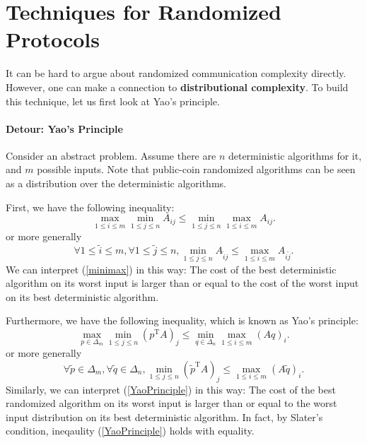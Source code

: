 \documentclass[openany]{book}
\begin{document}
\section{Techniques for Randomized Protocols}
It can be hard to argue about randomized communication complexity directly. However, one can make a connection to \textbf{distributional complexity}. To build this technique, let us first look at Yao's principle.
\paragraph{Detour: Yao's Principle}
Consider an abstract problem. Assume there are $n$ deterministic algorithms for it, and $m$ possible inputs. Note that public-coin randomized algorithms can be seen as a distribution over the deterministic algorithms.

First, we have the following inequality:
\begin{equation}\label{minimax}
    \max_{1\le i\le m}\min_{1\le j\le n}A_{ij}\le\min_{1\le j\le n}\max_{1\le i\le m}A_{ij}.
\end{equation}
or more generally
\begin{equation}
    \forall1\le\tilde{i}\le m,\forall1\le\tilde{j}\le n,\min_{1\le j\le n}A_{\tilde{i}j}\le\max_{1\le i\le m}A_{i\tilde{j}}.
\end{equation}
We can interpret (\ref{minimax}) in this way: The cost of the best deterministic algorithm on its worst input is larger than or equal to the cost of the worst input on its best deterministic algorithm.

Furthermore, we have the following inequality, which is known as Yao's principle:
\begin{equation}\label{YaoPrinciple}
    \max_{p\in\Delta_m}\min_{1\le j\le n}(p^{\mathrm{T}}A)_j\le\min_{q\in\Delta_n}\max_{1\le i\le m}(Aq)_i.
\end{equation}
or more generally
\begin{equation}
    \forall \tilde{p}\in\Delta_m,\forall \tilde{q}\in\Delta_n,\min_{1\le j\le n}(\tilde{p}^{\mathrm{T}}A)_j\le \max_{1\le i\le m}(A\tilde{q})_i.
\end{equation}
Similarly, we can interpret (\ref{YaoPrinciple}) in this way: The cost of the best randomized algorithm on its worst input is larger than or equal to the worst input distribution on its best deterministic algorithm. In fact, by Slater's condition, ineqaulity (\ref{YaoPrinciple}) holds with equality. \\
\end{document}
